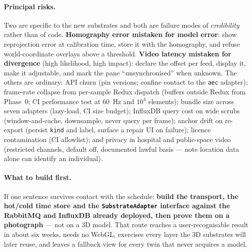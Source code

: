 \paragraph{Principal risks.} Two are specific to the new substrates and both are failure
modes of \emph{credibility} rather than of code. \textbf{Homography error mistaken for
model error}: show reprojection error at calibration time, store it with the homography,
and refuse world-coordinate overlays above a threshold. \textbf{Video latency mistaken
for divergence} (high likelihood, high impact): declare the offset per feed, display it,
make it adjustable, and mark the pane ``unsynchronised'' when unknown. The others are
ordinary:  API churn (pin versions; confine contact to the
\texttt{aec} adapter); frame-rate collapse from per-sample Redux dispatch (buffers
outside Redux from Phase~0; CI performance test at 60~Hz and $10^4$ elements); bundle
size across seven adapters (lazy-load, CI size budget); InfluxDB query cost on wide
scrubs (window-and-cache, downsample, never query per frame); anchor drift on
re-export (persist \texttt{kind} and label, surface a repair UI on failure); licence
contamination (CI allowlist); and privacy in hospital and public-space video (restricted
channels, default off, documented lawful basis --- \citet{ali2024spatial} note location
data alone can identify an individual).

\paragraph{What to build first.} If one sentence survives contact with the schedule:
\textbf{build the transport, the hot/cold time store and the \texttt{SubstrateAdapter}
interface against the RabbitMQ and InfluxDB already deployed, then prove them on a
photograph} --- not on a 3D model. That route reaches a user-recognisable result in
about six weeks, needs no WebGL, exercises every layer the 3D substrates will later
reuse, and leaves a fallback view for every twin that never acquires a model.

